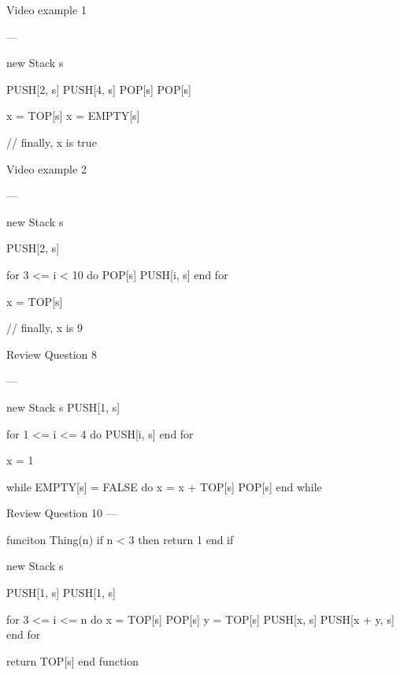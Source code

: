 Video example 1

---

new Stack s

PUSH[2, s]
PUSH[4, s]
POP[s]
POP[s]

x = TOP[s]
x = EMPTY[s]

// finally, x is true

Video example 2

--- 

new Stack s

PUSH[2, s]

for 3 <= i < 10 do
  POP[s]
  PUSH[i, s]
end for

x = TOP[s]

// finally, x is 9

Review Question 8

---

new Stack s
PUSH[1, s]

for 1 <= i <= 4 do
  PUSH[i, s]
end for

x = 1

while EMPTY[s] = FALSE do
  x = x + TOP[s]
  POP[s]
end while

Review Question 10
---

funciton Thing(n)
  if n < 3 then
    return 1
  end if

  new Stack s

  PUSH[1, s]
  PUSH[1, s]

  for 3 <= i <= n do
    x = TOP[s]
    POP[s]
    y = TOP[s]
    PUSH[x, s]
    PUSH[x + y, s]
  end for

  return TOP[s]
end function
